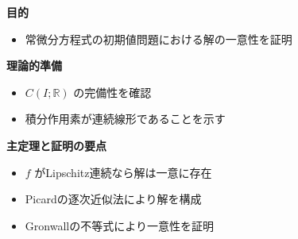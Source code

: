 \documentclass[aspectratio=169]{beamer}
\newenvironment{sectionblock}[1]{%
  \begin{minipage}{\textwidth}%
    \textbf{\large #1}\par\vspace{0.5em}%
}{%
  \end{minipage}\vspace{1em}%
}
\newcommand{\sectioncontent}[2]{%
  \begin{sectionblock}{#1}%
    \begin{itemize}%
      #2%
    \end{itemize}%
  \end{sectionblock}%
}
\begin{document}
\begin{frame}

\sectioncontent{目的}{
  \item 常微分方程式の初期値問題における解の一意性を証明
}

\sectioncontent{理論的準備}{
  \item \( C(I; \mathbb{R}) \) の完備性を確認
  \item 積分作用素が連続線形であることを示す
}

\sectioncontent{主定理と証明の要点}{
  \item \( f \) がLipschitz連続なら解は一意に存在
  \item Picardの逐次近似法により解を構成
  \item Gronwallの不等式により一意性を証明
}

\end{frame}
\end{document}
